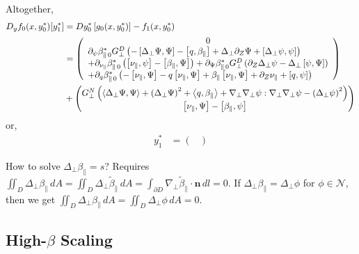 \documentclass{article}
\newcommand{\para}{\parallel}
\newcommand{\np}{\nabla_\perp}
\newcommand{\lap}{\Delta_\perp}
\newcommand{\p}{\partial}
\newcommand{\til}[1]{\widetilde{ #1 }}
\newcommand{\GN}{G_\perp^N}
\newcommand{\GD}{G_\perp^D}
\newcommand{\pth} [1] {\left( #1 \right) }
\newcommand{\br} [1] {\left[ #1 \right] }
\newcommand{\pmat} [1] {\begin{pmatrix} #1 \end{pmatrix}}
\begin{document}
Altogether,
\begin{align*}
D_yf_0(x,y_0^*)[y_1^*] &= Dy_0^*\br{g_0(x,y_0^*)} - f_1(x, y_0^*) \\
&= \left( \begin{array}{l}
    \multicolumn{1}{c}{0} \\
    \p_\psi\beta_{\para\,0}^*\GD \pth{- \br{\lap\Psi, \Psi} - \br{q, \beta_\para} + \lap\p_Z\Psi + \br{\lap\psi, \psi}} \\
    + \p_{\nu_\para}\beta_{\para\,0}^* \pth{\br{\nu_\para, \psi} - \br{\beta_\para, \Psi}}
    + \p_\Psi\beta_{\para\,0}^*\GD \pth{\p_Z\lap\psi - \lap\br{\psi, \Psi}} \\
    + \p_q\beta_{\para\,0}^* \pth{- \br{\nu_\para, \Psi} -  q\br{\nu_\para, \Psi} + \beta_\para\br{\nu_\para, \Psi} + \p_Z\nu_\para + \br{q, \psi}}
\end{array} \right) \\
&+ \pmat{\GN\pth{\Braket{\lap\Psi, \Psi} + \pth{\lap\Psi}^2 + \Braket{q,\beta_\para} + \np\np\psi:\np\np\psi - \pth{\lap\psi}^2} \\
\br{\nu_\para, \Psi} - \br{\beta_\para, \psi}}
\end{align*}
or,
\begin{align}
    y_1^* &= \pmat{ \\ }
\end{align}

How to solve $\lap\beta_\para = s$? Requires $\iint_D \lap\beta_\para\,dA = \iint_D \lap\til{\beta}_\para\,dA = \int_{\p D} \np\til{\beta}_\para\cdot\bm{n}\,dl = 0$. If $\lap\beta_\para = \lap\phi$ for $\phi\in\mathcal{N}$, then we get $\iint_D \lap\beta_\para\,dA = \iint_D \lap\phi\,dA = 0$.





\subsection{High-$\beta$ Scaling}
\end{document}
